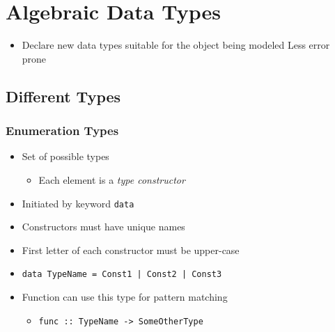 
\section{Algebraic Data Types}
\begin{itemize}
    \item Declare new data types suitable for the object being modeled
    \ipro Less error prone
\end{itemize}

\subsection{Different Types}
\subsubsection{Enumeration Types}
\begin{itemize}
    \item Set of possible types
        \begin{itemize}
            \item Each element is a \textit{type constructor}
        \end{itemize}
    \item Initiated by keyword \verb+data+
    \item Constructors must have unique names
    \item First letter of each constructor must be upper-case
    \item \verb+data TypeName = Const1 | Const2 | Const3+
    \item Function can use this type for pattern matching
        \begin{itemize}
            \item \verb+func :: TypeName -> SomeOtherType+
        \end{itemize}
\end{itemize}

